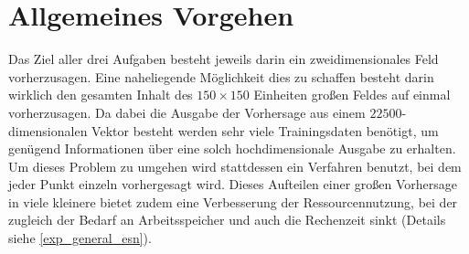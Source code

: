 \section{Allgemeines Vorgehen}
\label{sc:experiments_general}
Das Ziel aller drei Aufgaben besteht jeweils darin ein zweidimensionales Feld vorherzusagen. Eine naheliegende Möglichkeit dies zu schaffen besteht darin wirklich den gesamten Inhalt des $150 \times 150$ Einheiten großen Feldes auf einmal vorherzusagen. Da dabei die Ausgabe der Vorhersage aus einem $22500$-dimensionalen Vektor besteht werden sehr viele Trainingsdaten benötigt, um genügend Informationen über eine solch hochdimensionale Ausgabe zu erhalten. Um dieses Problem zu umgehen wird stattdessen ein Verfahren benutzt, bei dem jeder Punkt einzeln vorhergesagt wird. Dieses Aufteilen einer großen Vorhersage in viele kleinere bietet zudem eine Verbesserung der Ressourcennutzung, bei der zugleich der Bedarf an Arbeitsspeicher und auch die Rechenzeit sinkt (Details siehe \ref{exp_general_esn}).\\

